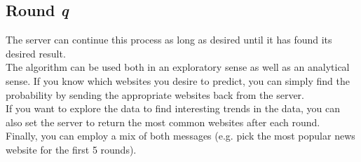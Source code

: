 \documentclass[12pt]{article}
\begin{document}
	\subsection*{Round {\em q}}
	
	The server can continue this process as long as desired until it has found its desired result.\\
	
	The algorithm can be used both in an exploratory sense as well as an analytical sense. If you know which websites you desire to predict, you can simply find the probability by sending the appropriate websites back from the server.\\
	
	If you want to explore the data to find interesting trends in the data, you can also set the server to return the most common websites after each round.\\
	
	Finally, you can employ a mix of both messages (e.g. pick the most popular news website for the first 5 rounds).
	
	
\end{document}
